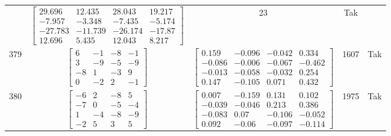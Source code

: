 \documentclass[a4paper,12pt]{article}
\begin{document}
\begin{tabular}{c c c c c}
&
$\begin{bmatrix} 29.696 & 12.435 & 28.043 & 19.217 \\ -7.957 & -3.348 & -7.435 & -5.174 \\ -27.783 & -11.739 & -26.174 & -17.87 \\ 12.696 & 5.435 & 12.043 & 8.217 \end{bmatrix}$
&
23
&
Tak
\\
379
&
$\begin{bmatrix} 6 & -1 & -8 & -1 \\ 3 & -9 & -5 & -9 \\ -8 & 1 & -3 & 9 \\ 0 & -2 & 2 & -1 \end{bmatrix}$
&
$\begin{bmatrix} 0.159 & -0.096 & -0.042 & 0.334 \\ -0.086 & -0.006 & -0.067 & -0.462 \\ -0.013 & -0.058 & -0.032 & 0.254 \\ 0.147 & -0.105 & 0.071 & 0.432 \end{bmatrix}$
&
1607
&
Tak
\\
380
&
$\begin{bmatrix} -6 & 2 & -8 & 5 \\ -7 & 0 & -5 & -4 \\ 1 & -4 & -8 & -9 \\ -2 & 5 & 3 & 5 \end{bmatrix}$
&
$\begin{bmatrix} 0.007 & -0.159 & 0.131 & 0.102 \\ -0.039 & -0.046 & 0.213 & 0.386 \\ -0.083 & 0.07 & -0.106 & -0.052 \\ 0.092 & -0.06 & -0.097 & -0.114 \end{bmatrix}$
&
1975
&
Tak
\\
\end{tabular} \egroup \newpage
\end{document}
